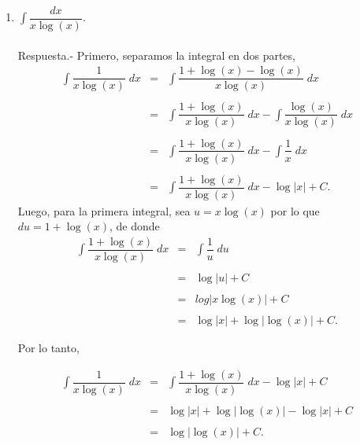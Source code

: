 \begin{enumerate}[\bfseries 1.]
    \item $\displaystyle\int \dfrac{dx}{x\log(x)}$.\\\\
	Respuesta.-\; Primero, separamos la integral en dos partes,
	$$
	\begin{array}{rcl}
	    \displaystyle\int \dfrac{1}{x\log(x)}\; dx &=& \displaystyle\int \dfrac{1+\log(x)-\log(x)}{x\log(x)}\; dx\\\\
						       &=& \displaystyle\int \dfrac{1+\log(x)}{x\log(x)}\; dx - \int \dfrac{\log(x)}{x\log(x)}\; dx\\\\
						       &=& \displaystyle\int \dfrac{1+\log(x)}{x\log(x)} \; dx-\int \dfrac{1}{x}\; dx\\\\
						       &=& \displaystyle\int \dfrac{1+\log(x)}{x\log(x)}\; dx -\log|x|+C.
	\end{array}
	$$
	Luego, para la primera integral, sea $u=x\log(x)$ por lo que $du=1+\log(x)$, de donde
	$$
	\begin{array}{rcl}
	    \displaystyle\int \dfrac{1+\log(x)}{x\log(x)}\; dx &=& \displaystyle\int \dfrac{1}{u}\; du\\\\
							     &=& \log|u|+C\\\\
							     &=& log|x\log(x)|+C\\\\
							     &=& \log|x|+\log|\log(x)|+C.
	\end{array}
	$$

	Por lo tanto,

	$$
	\begin{array}{rcl}
	    \displaystyle\int \dfrac{1}{x\log(x)}\; dx &=& \displaystyle\int \dfrac{1+\log(x)}{x\log(x)}\; dx-\log|x|+C\\\\
						       &=& \log|x|+\log|\log(x)|-\log|x|+C\\\\
						       &=& \log|\log(x)|+C.
	\end{array}
	$$
	\vspace{.5cm}


\end{enumerate}
